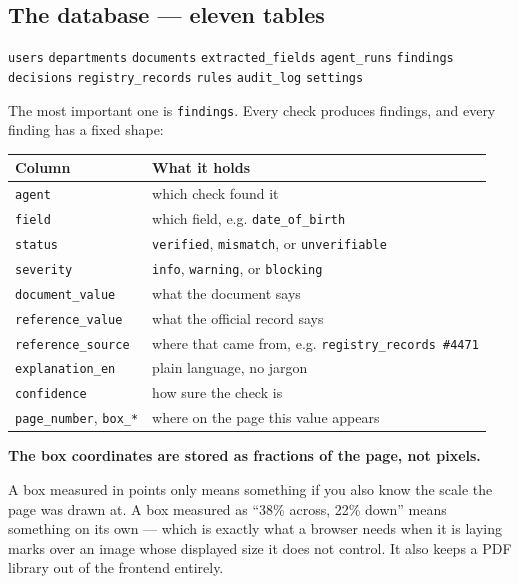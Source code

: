 \documentclass[11pt,a4paper]{article}
\newcommand{\keyline}[1]{%
  \par\vspace{4pt}%
  \noindent\colorbox{shade}{\parbox{\dimexpr\linewidth-2\fboxsep}{\textbf{#1}}}%
  \par\vspace{6pt}%
}
\begin{document}
\subsection{The database --- eleven tables}

\begin{center}
\small
\texttt{users} \textbullet{} \texttt{departments} \textbullet{} \texttt{documents}
\textbullet{} \texttt{extracted\_fields} \textbullet{} \texttt{agent\_runs}
\textbullet{} \texttt{findings} \textbullet{} \texttt{decisions} \textbullet{}
\texttt{registry\_records} \textbullet{} \texttt{rules} \textbullet{}
\texttt{audit\_log} \textbullet{} \texttt{settings}
\end{center}

The most important one is \texttt{findings}. Every check produces findings, and
every finding has a fixed shape:

\begin{longtable}{@{}p{4.2cm}p{10.2cm}@{}}
\toprule
\textbf{Column} & \textbf{What it holds} \\
\midrule
\endhead
\texttt{agent} & which check found it \\
\texttt{field} & which field, e.g. \texttt{date\_of\_birth} \\
\texttt{status} & \texttt{verified}, \texttt{mismatch}, or \texttt{unverifiable} \\
\texttt{severity} & \texttt{info}, \texttt{warning}, or \texttt{blocking} \\
\texttt{document\_value} & what the document says \\
\texttt{reference\_value} & what the official record says \\
\texttt{reference\_source} & where that came from, e.g. \texttt{registry\_records \#4471} \\
\texttt{explanation\_en} & plain language, no jargon \\
\texttt{confidence} & how sure the check is \\
\texttt{page\_number}, \texttt{box\_*} & where on the page this value appears \\
\bottomrule
\end{longtable}

\keyline{The box coordinates are stored as fractions of the page, not pixels.}

A box measured in points only means something if you also know the scale the
page was drawn at. A box measured as ``38\% across, 22\% down'' means something
on its own --- which is exactly what a browser needs when it is laying marks
over an image whose displayed size it does not control. It also keeps a PDF
library out of the frontend entirely.
\end{document}
